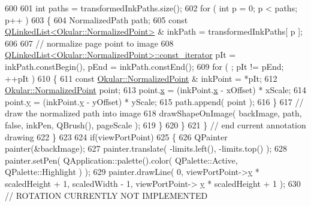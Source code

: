 \begin{DoxyCode}
600 
601                     \textcolor{keywordtype}{int} paths = transformedInkPaths.size();
602                     \textcolor{keywordflow}{for} ( \textcolor{keywordtype}{int} p = 0; p < paths; p++ )
603                     \{
604                         NormalizedPath path;
605                         \textcolor{keyword}{const} \hyperlink{classQLinkedList}{QLinkedList<Okular::NormalizedPoint>} & 
      inkPath = transformedInkPaths[ p ];
606 
607                         \textcolor{comment}{// normalize page point to image}
608                         \hyperlink{classQLinkedList}{QLinkedList<Okular::NormalizedPoint>::const\_iterator}
       pIt = inkPath.constBegin(), pEnd = inkPath.constEnd();
609                         \textcolor{keywordflow}{for} ( ; pIt != pEnd; ++pIt )
610                         \{
611                             \textcolor{keyword}{const} \hyperlink{classOkular_1_1NormalizedPoint}{Okular::NormalizedPoint} & inkPoint = *pIt;
612                             \hyperlink{classOkular_1_1NormalizedPoint}{Okular::NormalizedPoint} point;
613                             point.\hyperlink{classOkular_1_1NormalizedPoint_a857f49b9bc7712430d167472ef9dbd94}{x} = (inkPoint.\hyperlink{classOkular_1_1NormalizedPoint_a857f49b9bc7712430d167472ef9dbd94}{x} - xOffset) * xScale;
614                             point.\hyperlink{classOkular_1_1NormalizedPoint_ac2276daabda627d5f82bb1532c293047}{y} = (inkPoint.\hyperlink{classOkular_1_1NormalizedPoint_ac2276daabda627d5f82bb1532c293047}{y} - yOffset) * yScale;
615                             path.append( point );
616                         \}
617                         \textcolor{comment}{// draw the normalized path into image}
618                         drawShapeOnImage( backImage, path, \textcolor{keyword}{false}, inkPen, QBrush(), pageScale );
619                     \}
620                 \}
621             \} \textcolor{comment}{// end current annotation drawing}
622         \}
623 
624         \textcolor{keywordflow}{if}(viewPortPoint)
625         \{
626             QPainter painter(&backImage);
627             painter.translate( -limits.left(), -limits.top() );
628             painter.setPen( QApplication::palette().color( QPalette::Active, QPalette::Highlight ) );
629             painter.drawLine( 0, viewPortPoint->\hyperlink{classOkular_1_1NormalizedPoint_ac2276daabda627d5f82bb1532c293047}{y} * scaledHeight + 1, scaledWidth - 1, viewPortPoint->
      \hyperlink{classOkular_1_1NormalizedPoint_ac2276daabda627d5f82bb1532c293047}{y} * scaledHeight + 1 );
630 \textcolor{comment}{// ROTATION CURRENTLY NOT IMPLEMENTED}

\end{DoxyCode}
